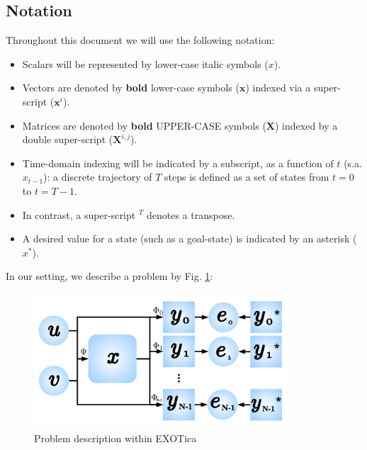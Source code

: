 \documentclass[12pt,a4paper,onecolumn]{article}
\begin{document}
\subsection{Notation}
Throughout this document we will use the following notation:
\begin{itemize}
\item Scalars will be represented by lower-case italic symbols ($x$).
\item Vectors are denoted by \textbf{bold} lower-case symbols ($\mathbf{x}$) indexed via a super-script ($\mathbf{x}^i$).
\item Matrices are denoted by \textbf{bold} UPPER-CASE symbols ($\mathbf{X}$) indexed by a double super-script ($\mathbf{X}^{i,j}$).
\item Time-domain indexing will be indicated by a subscript, as a function of $t$ (s.a. $x_{t-1}$): a discrete trajectory of $T$ steps is defined as a set of states from $t=0$ to $t=T-1$.
\item In contrast, a super-script $^T$ denotes a transpose.
\item A desired value for a state (such as a goal-state) is indicated by an asterisk ($x^*$).
\end{itemize}

\noindent In our setting, we describe a problem by Fig. \ref{FIG_PROBLEM_DESCRIPTION}:
\begin{figure}[!htp]
	\centering
    \includegraphics[width=0.85\textwidth]{Problem_description.png}
    \caption{Problem description within EXOTica}
   	\label{FIG_PROBLEM_DESCRIPTION}
\end{figure}\\
\end{document}
